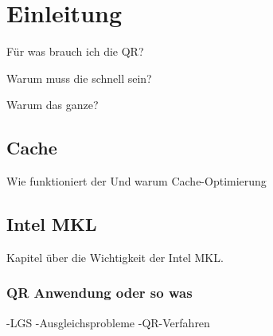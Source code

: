 \chapter{Einleitung}

Für was brauch ich die QR?

Warum muss die schnell sein?

Warum das ganze?

\section{Cache}
Wie funktioniert der
Und warum Cache-Optimierung

\section{Intel MKL}

Kapitel über die Wichtigkeit der Intel MKL.

\subsection{QR Anwendung oder so was}
-LGS 
-Ausgleichsprobleme 
-QR-Verfahren 